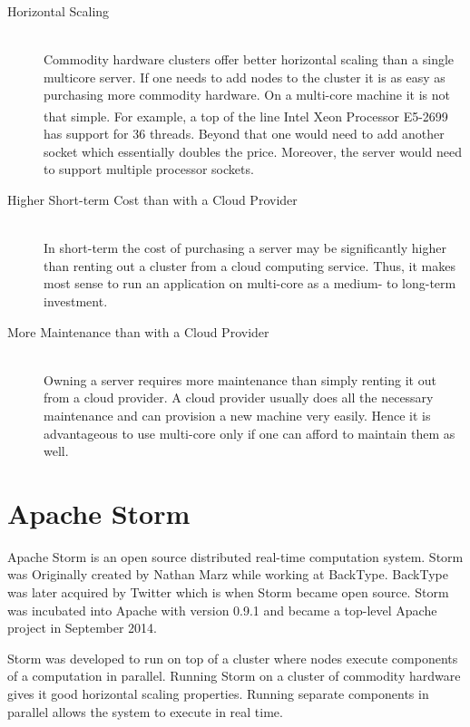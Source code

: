 \documentclass[bsc,logo,frontabs,twoside,singlespacing,normalheadings,parskip]{infthesis}\usepackage[]{graphicx}\usepackage[]{color}
\begin{document}
\begin{description}
	\item[Horizontal Scaling] \hfill \\
	Commodity hardware clusters offer better horizontal scaling than a single multicore server. If one needs to add nodes to the cluster it is as easy as purchasing more commodity hardware. On a multi-core machine it is not that simple. For example, a top of the line Intel\textsuperscript{\textregistered} Xeon\textsuperscript{\textregistered} Processor E5-2699 has support for 36 threads. Beyond that one would need to add another socket which essentially doubles the price. Moreover, the server would need to support multiple processor sockets.
	\item[Higher Short-term Cost than with a Cloud Provider] \hfill \\
	In short-term the cost of purchasing a server may be significantly higher than renting out a cluster from a cloud computing service. Thus, it makes most sense to run an application on multi-core as a medium- to long-term investment.
	\item[More Maintenance than with a Cloud Provider] \hfill \\
	Owning a server requires more maintenance than simply renting it out from a cloud provider. A cloud provider usually does  all the necessary maintenance and can provision a new machine very easily. Hence it is advantageous to use multi-core only if one can afford to maintain them as well.
\end{description}


\section{Apache Storm}
\label{sec:apache_storm}

Apache Storm is an open source distributed real-time computation system. Storm was Originally created by Nathan Marz while working at BackType. \cite{NathanAbout} BackType was later acquired by Twitter which is when Storm became open source. Storm was incubated into Apache with version 0.9.1 and became a top-level Apache project in September 2014.

Storm was developed to run on top of a cluster where nodes execute components of a computation in parallel. Running Storm on a cluster of commodity hardware gives it good horizontal scaling properties. Running separate components in parallel allows the system to execute in real time.
\end{document}
